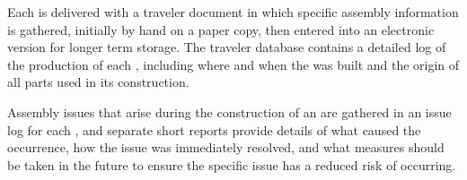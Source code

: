 Each  is delivered with a traveler document in which specific assembly information is gathered, initially by hand on a paper copy, then entered into an electronic version for longer term storage.  The traveler database contains a detailed log of the production of each , including where and when the  was built and the origin of all parts used in its construction. 

Assembly issues that arise during the construction of an  are gathered in an issue log for each , and separate short reports provide details of what caused the occurrence, how the issue was immediately resolved, and what measures should be taken in the future to ensure the specific issue has a reduced risk of occurring.  


